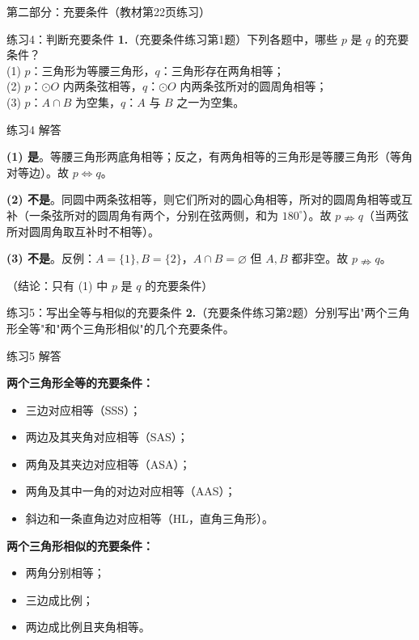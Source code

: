 \documentclass[10pt,aspectratio=169,serif]{beamer}
\begin{document}
\begin{frame}[t]{第二部分：充要条件（教材第22页练习）}
\end{frame}

\begin{frame}[t]{练习4：判断充要条件}
\textbf{1.}（充要条件练习第1题）下列各题中，哪些 $p$ 是 $q$ 的充要条件？\\
(1) $p$：三角形为等腰三角形，$q$：三角形存在两角相等；\\
(2) $p$：$\odot O$ 内两条弦相等，$q$：$\odot O$ 内两条弦所对的圆周角相等；\\
(3) $p$：$A \cap B$ 为空集，$q$：$A$ 与 $B$ 之一为空集。
\end{frame}

\begin{frame}[t]{练习4 解答}
\begin{tcolorbox}[colback=orange!10,colframe=orange,title=\textbf{解}]
\textbf{(1) 是}。等腰三角形两底角相等；反之，有两角相等的三角形是等腰三角形（等角对等边）。故 $p\Leftrightarrow q$。

\textbf{(2) 不是}。同圆中两条弦相等，则它们所对的圆心角相等，所对的圆周角\alert{相等或互补}（一条弦所对的圆周角有两个，分别在弦两侧，和为 $180^\circ$）。故 $p\nRightarrow q$（当两弦所对圆周角取互补时不相等）。

\textbf{(3) 不是}。反例：$A=\{1\}, B=\{2\}$，$A\cap B=\varnothing$ 但 $A,B$ 都非空。故 $p\nRightarrow q$。

\vspace{0.5em}
\small（结论：只有 (1) 中 $p$ 是 $q$ 的充要条件）
\end{tcolorbox}
\end{frame}

\begin{frame}[t]{练习5：写出全等与相似的充要条件}
\textbf{2.}（充要条件练习第2题）分别写出"两个三角形全等"和"两个三角形相似"的几个充要条件。
\end{frame}

\begin{frame}[t]{练习5 解答}
\begin{tcolorbox}[colback=orange!10,colframe=orange,title=\textbf{解}]
\textbf{两个三角形全等的充要条件：}
\begin{itemize}
  \item 三边对应相等（SSS）；
  \item 两边及其夹角对应相等（SAS）；
  \item 两角及其夹边对应相等（ASA）；
  \item 两角及其中一角的对边对应相等（AAS）；
  \item 斜边和一条直角边对应相等（HL，直角三角形）。
\end{itemize}

\textbf{两个三角形相似的充要条件：}
\begin{itemize}
  \item 两角分别相等；
  \item 三边成比例；
  \item 两边成比例且夹角相等。
\end{itemize}
\end{tcolorbox}
\end{frame}
\end{document}
